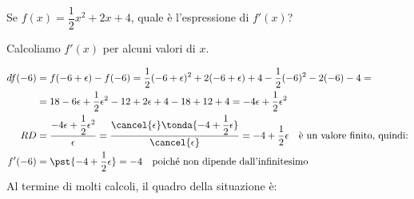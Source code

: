 \begin{esempio}
\label{esempio:esempio_5}
Se \(f(x)=\dfrac{1}{2}x^2+2x+4\), quale è l'espressione di \(f'(x)\)?

Calcoliamo \(f'(x)\) per alcuni valori di \(x\).

\begin{align*}
df(-6) &= f(-6 + \epsilon) -f(-6) =
   \dfrac{1}{2}(-6+\epsilon)^2+2(-6 +\epsilon)+4 - 
              \dfrac{1}{2}(-6)^2-2(-6)-4 = \\
&= 18 - 6\epsilon +\dfrac{1}{2}\epsilon^2 -12 +2\epsilon +4 - 18 +12 +4 = 
-4 \epsilon +\dfrac{1}{2}\epsilon^2 \\
RD &=  \dfrac{-4\epsilon +\dfrac{1}{2}\epsilon^2}{\epsilon} = 
       \dfrac{\cancel{\epsilon}\tonda{-4 +\dfrac{1}{2}\epsilon}} 
             {\cancel{\epsilon}} = -4 +\dfrac{1}{2}\epsilon 
       \quad \text{è un valore finito, quindi:}\\
f'(-6) &= \pst{-4 +\dfrac{1}{2}\epsilon} = -4 
       \quad \text{poiché non dipende dall'infinitesimo}
\end{align*}
Al termine di molti calcoli, il quadro della situazione è:


\end{esempio}
